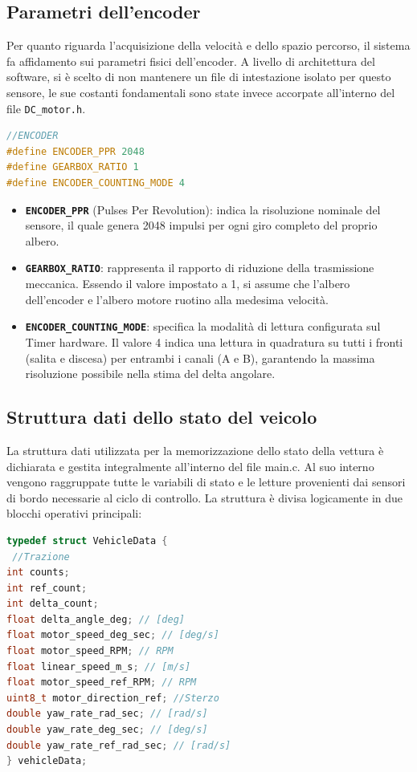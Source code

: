 \documentclass[11pt]{report}
\begin{document}
\subsection{Parametri dell'encoder}
Per quanto riguarda l'acquisizione della velocità e dello spazio percorso, il sistema fa affidamento sui parametri fisici dell'encoder. A livello di architettura del software, si è scelto di non mantenere un file di intestazione isolato per questo sensore, le sue costanti fondamentali sono state invece accorpate all'interno del file \texttt{DC\_motor.h}. 

\begin{lstlisting}[language=Cpp, caption={DC\_motor.h}]
//ENCODER 
#define ENCODER_PPR 2048 
#define GEARBOX_RATIO 1 
#define ENCODER_COUNTING_MODE 4 
\end{lstlisting}

\begin{itemize}
    \item \textbf{\texttt{ENCODER\_PPR}} (Pulses Per Revolution): indica la risoluzione nominale del sensore, il quale genera 2048 impulsi per ogni giro completo del proprio albero. 
    \item \textbf{\texttt{GEARBOX\_RATIO}}: rappresenta il rapporto di riduzione della trasmissione meccanica. Essendo il valore impostato a 1, si assume che l'albero dell'encoder e l'albero motore ruotino alla medesima velocità. 
    \item \textbf{\texttt{ENCODER\_COUNTING\_MODE}}: specifica la modalità di lettura configurata sul Timer hardware. Il valore 4 indica una lettura in quadratura su tutti i fronti (salita e discesa) per entrambi i canali (A e B), garantendo la massima risoluzione possibile nella stima del delta angolare. 
\end{itemize}

\subsection{Struttura dati dello stato del veicolo} 
La struttura dati utilizzata per la memorizzazione dello stato della vettura è dichiarata e gestita integralmente all'interno del file main.c. Al suo interno vengono raggruppate tutte le variabili di stato e le letture provenienti dai sensori di bordo necessarie al ciclo di controllo. La struttura è divisa logicamente in due blocchi operativi principali: 

\begin{lstlisting}[language=Cpp, caption={Main.c}]
typedef struct VehicleData {
 //Trazione 
int counts; 
int ref_count; 
int delta_count; 
float delta_angle_deg; // [deg] 
float motor_speed_deg_sec; // [deg/s] 
float motor_speed_RPM; // RPM 
float linear_speed_m_s; // [m/s] 
float motor_speed_ref_RPM; // RPM 
uint8_t motor_direction_ref; //Sterzo 
double yaw_rate_rad_sec; // [rad/s] 
double yaw_rate_deg_sec; // [deg/s] 
double yaw_rate_ref_rad_sec; // [rad/s] 
} vehicleData; 
\end{lstlisting}
\end{document}
